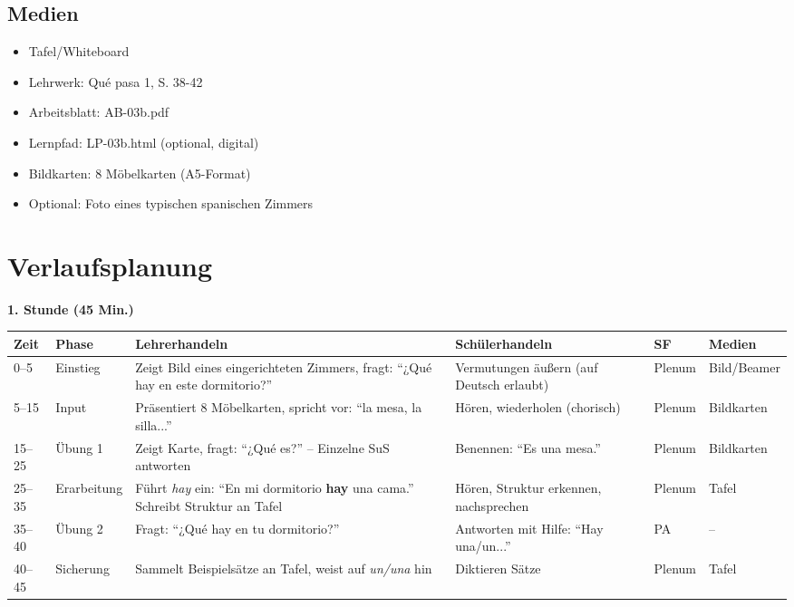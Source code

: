 \documentclass[11pt,a4paper]{article}
\newcommand{\lehrwerk}{Qué pasa 1}
\newcommand{\lehrwerkseite}{S. 38-42}
\begin{document}
\subsection{Medien}
\begin{itemize}
    \item Tafel/Whiteboard
    \item Lehrwerk: \lehrwerk, \lehrwerkseite
    \item Arbeitsblatt: AB-03b.pdf
    \item Lernpfad: LP-03b.html (optional, digital)
    \item Bildkarten: 8 Möbelkarten (A5-Format)
    \item Optional: Foto eines typischen spanischen Zimmers
\end{itemize}

\section{Verlaufsplanung}

\textbf{1. Stunde (45 Min.)}

\begin{longtable}{|p{1cm}|p{1.5cm}|p{4cm}|p{3cm}|p{2cm}|p{2cm}|}
\hline
\textbf{Zeit} & \textbf{Phase} & \textbf{Lehrerhandeln} & \textbf{Schülerhandeln} & \textbf{SF} & \textbf{Medien} \\
\hline
\endhead

0--5 & Einstieg & Zeigt Bild eines eingerichteten Zimmers, fragt: ``¿Qué hay en este dormitorio?'' & Vermutungen äußern (auf Deutsch erlaubt) & Plenum & Bild/Beamer \\
\hline

5--15 & Input & Präsentiert 8 Möbelkarten, spricht vor: ``la mesa, la silla...'' & Hören, wiederholen (chorisch) & Plenum & Bildkarten \\
\hline

15--25 & Übung 1 & Zeigt Karte, fragt: ``¿Qué es?'' -- Einzelne SuS antworten & Benennen: ``Es una mesa.'' & Plenum & Bildkarten \\
\hline

25--35 & Erarbei\-tung & Führt \textit{hay} ein: ``En mi dormitorio \textbf{hay} una cama.'' Schreibt Struktur an Tafel & Hören, Struktur erkennen, nachsprechen & Plenum & Tafel \\
\hline

35--40 & Übung 2 & Fragt: ``¿Qué hay en tu dormitorio?'' & Antworten mit Hilfe: ``Hay una/un...'' & PA & -- \\
\hline

40--45 & Sicherung & Sammelt Beispielsätze an Tafel, weist auf \textit{un/una} hin & Diktieren Sätze & Plenum & Tafel \\
\hline
\end{longtable}
\end{document}

